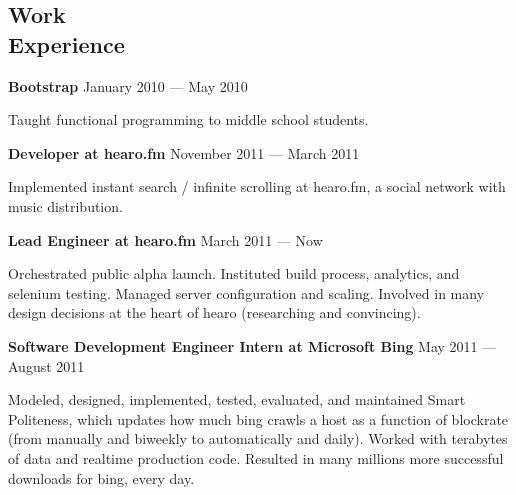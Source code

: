 \documentclass[margin,line]{resume}
\begin{document}
\begin{resume}

    \section{\mysidestyle{} Work\\Experience}

    \textbf{Bootstrap}  \hfill January 2010 — May 2010  \par\vspace{-4.0mm}   
     {\addtolength{\leftskip}{2 mm}
  Taught functional programming to middle school students.
      \par}
    
    \textbf{Developer at hearo.fm}  \hfill November 2011 — March 2011   \par\vspace{-4.0mm} 
     {\addtolength{\leftskip}{2 mm}
       Implemented instant search / infinite scrolling at hearo.fm, a social network with music distribution.
       \par}
       
    \textbf{Lead Engineer at hearo.fm} \hfill March 2011 — Now      \par\vspace{-4.0mm}
          {\addtolength{\leftskip}{2 mm}
          Orchestrated public alpha launch. Instituted build process, analytics, and selenium testing. Managed server configuration and scaling. Involved in many design decisions at the heart of hearo (researching and convincing).
      \par}

  \textbf{Software Development Engineer Intern at Microsoft Bing}  \hfill May 2011 — August 2011  \par\vspace{-4.0mm}
          {\addtolength{\leftskip}{2 mm}
           Modeled, designed, implemented, tested, evaluated, and maintained Smart Politeness, which updates how much bing crawls a host as a function of blockrate (from manually and biweekly to automatically and daily). Worked with terabytes of data and realtime production code. Resulted in many millions more successful downloads for bing, every day. 
 \par}


\end{resume}
\end{document}
